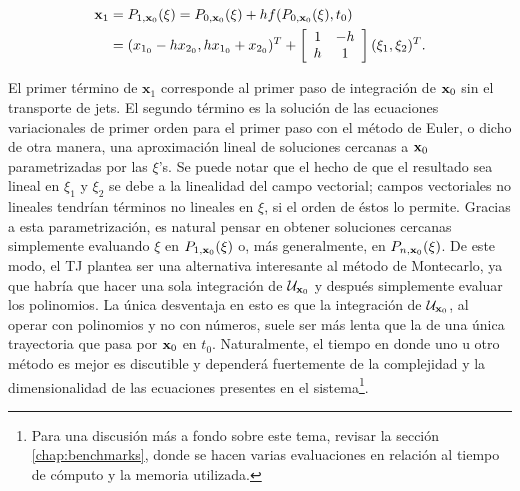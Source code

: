 \begin{align*}
\mathbf{x}_1 &= P_{1,\mathbf{x}_0}(\xi) = P_{0,\mathbf{x}_0}(\xi) + h f(P_{0,\mathbf{x}_0}(\xi),t_0) \\
&= (x_{1_0} - h x_{2_0}, h x_{1_0} + x_{2_0} )^T + \left[ \begin{array}{cc}
 1 & -h  \\
h & 1  \\
\end{array} \right] (\xi_1,\xi_2)^T.
\end{align*} 

El primer término de $\mathbf{x}_1$ corresponde al primer paso de integración de $\mathbf{x}_0$ sin el transporte de jets. El segundo término es la solución de las ecuaciones variacionales de primer orden para el primer paso con el método de Euler, o dicho de otra manera, una aproximación lineal de soluciones cercanas a $\mathbf{x}_0$ parametrizadas por las $\xi$'s. Se puede notar que el hecho de que el resultado sea lineal en $\xi_1$ y $\xi_2$ se debe a la linealidad del campo vectorial; campos vectoriales no lineales tendrían términos no lineales en $\xi$, si el orden de éstos lo permite. Gracias a esta parametrización, es natural pensar en obtener soluciones cercanas simplemente evaluando $\xi$ en $P_{1,\mathbf{x}_0}(\xi)$ o, más generalmente, en $P_{n,\mathbf{x}_0}(\xi)$. De este modo, el TJ plantea ser una alternativa interesante al método de Montecarlo, ya que habría que hacer una sola integración de $\mathcal{U}_{\mathbf{x}_0}$ y después simplemente evaluar los polinomios. La única desventaja en esto es que la integración de $\mathcal{U}_{\mathbf{x}_0}$, al operar con polinomios y no con números, suele ser más lenta que la de una única trayectoria que pasa por $\mathbf{x}_0$ en $t_0$. Naturalmente, el tiempo en donde uno u otro método es mejor es discutible y dependerá fuertemente de la complejidad y la dimensionalidad de las ecuaciones presentes en el sistema\footnote{Para una discusión más a fondo sobre este tema, revisar la sección \ref{chap:benchmarks}, donde se hacen varias evaluaciones en relación al tiempo de cómputo y la memoria utilizada.}.

